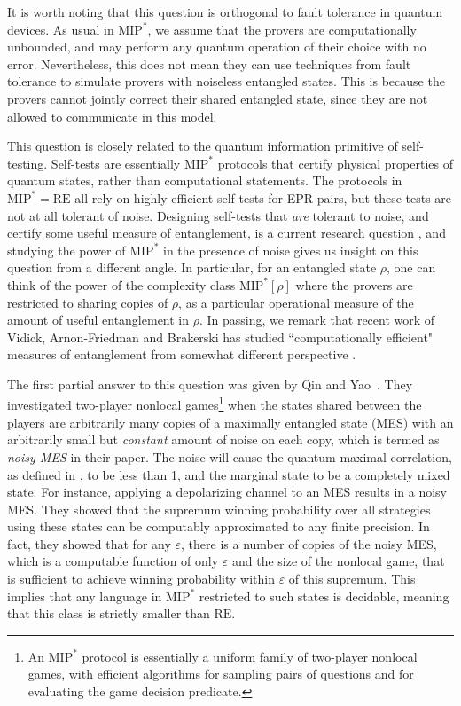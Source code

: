 \documentclass[11pt]{article}
\theoremstyle{plain}
\theoremstyle{definition}
\newcommand{\1}{\mathbb{1}} %
\newcommand{\MIP}{\mathrm{MIP}}
\newcommand{\RE}{\mathrm{RE}}
\begin{document}
It is worth noting that this question is orthogonal to fault tolerance in quantum devices. As usual in $\MIP^*$, we assume that the provers are computationally unbounded, and may perform any quantum operation of their choice with no error. Nevertheless, this does not mean they can use techniques from fault tolerance to simulate provers with noiseless entangled states. This is because the provers cannot jointly correct their shared entangled state, since they are not allowed to communicate in this model.  


This question is closely related to the quantum information primitive of self-testing. Self-tests are essentially $\MIP^*$ protocols that certify physical properties of quantum states, rather than computational statements. The protocols in $\MIP^* = \RE$ all rely on highly efficient self-tests for EPR pairs, but these tests are not at all tolerant of noise. Designing self-tests that \emph{are} tolerant to noise, and certify some useful measure of entanglement, is a current research question \cite{arnonFYen2018,arnon2019device}, and studying the power of $\MIP^*$ in the presence of noise gives us insight on this question from a different angle. In particular, for an entangled state $\rho$, one can think of the power of the complexity class $\MIP^*[\rho]$ where the provers are restricted to sharing copies of $\rho$, as a particular operational measure of the amount of useful entanglement in $\rho$. In passing, we remark that recent work of Vidick, Arnon-Friedman and Brakerski has studied ``computationally efficient" measures of entanglement from somewhat different perspective \cite{arnon2023computational}.



The first partial answer to this question was given by Qin and Yao~\cite{qin2021nonlocal}. They investigated two-player nonlocal games\footnote{An $\MIP^*$ protocol is essentially a uniform family of two-player nonlocal games, with efficient algorithms for sampling pairs of questions and for evaluating the game decision predicate.} when the states shared between the players are arbitrarily many copies of a maximally entangled state (MES) with an arbitrarily small but \emph{constant} amount of noise on each copy, which is termed as {\em noisy MES} in their paper. 
The noise will cause the quantum maximal correlation, as defined in , to be less than 1, and the marginal state to be a completely mixed state. For instance, applying a depolarizing channel to an MES results in a noisy MES.
They showed that the supremum winning probability over all strategies using these states can be computably approximated to any finite precision. In fact, they showed that for any $\varepsilon$, there is a number of copies of the noisy MES, which is a computable function of only $\varepsilon$ and the size of the nonlocal game, that is sufficient to achieve winning probability within $\varepsilon$ of this supremum. This implies that any language in $\MIP^*$ restricted to such states is decidable, meaning that this class is strictly smaller than $\RE$.
\end{document}
